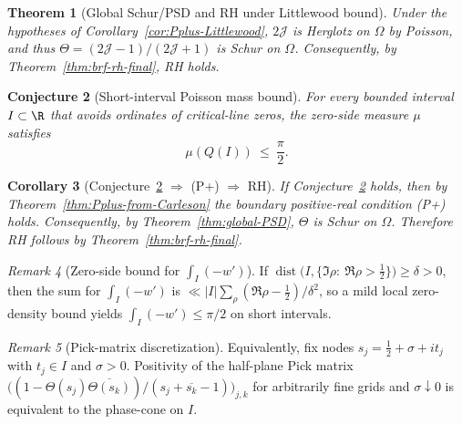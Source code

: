 \documentclass[11pt]{article}
\newtheorem{theorem}{Theorem}
\newtheorem{conjecture}[theorem]{Conjecture}
\newtheorem{corollary}[theorem]{Corollary}
\theoremstyle{remark}
\newtheorem{remark}[theorem]{Remark}
\begin{document}
\begin{theorem}[Global Schur/PSD and RH under Littlewood bound]\label{thm:global-RH-Littlewood}
Under the hypotheses of Corollary~\ref{cor:Pplus-Littlewood}, \(2\mathcal J\) is Herglotz on \(\Omega\) by Poisson, and thus \(\Theta=(2\mathcal J-1)/(2\mathcal J+1)\) is Schur on \(\Omega\). Consequently, by Theorem~\ref{thm:brf-rh-final}, RH holds.
\end{theorem}

\begin{conjecture}[Short-interval Poisson mass bound]\label{conj:short-interval-poisson}
For every bounded interval \(I\subset\R\) that avoids ordinates of critical-line zeros, the zero-side measure \(\mu\) satisfies
\[
 \mu(Q(I))\ \le\ \frac{\pi}{2}.
\]
\end{conjecture}

\begin{corollary}[Conjecture~\ref{conj:short-interval-poisson} \(\Rightarrow\) (P+) \(\Rightarrow\) RH]\label{cor:conj-to-RH}
If Conjecture~\ref{conj:short-interval-poisson} holds, then by Theorem~\ref{thm:Pplus-from-Carleson} the boundary positive-real condition \emph{(P+)} holds. Consequently, by Theorem~\ref{thm:global-PSD}, \(\Theta\) is Schur on \(\Omega\). Therefore RH follows by Theorem~\ref{thm:brf-rh-final}.
\end{corollary}
\begin{remark}[Zero-side bound for \(\int_I(-w')\)]
If \(\operatorname{dist}\big(I,\{\Im\rho:\ \Re\rho>\tfrac12\}\big)\ge \delta>0\), then the sum for \(\int_I(-w')\) is \(\ll |I|\sum_{\rho}(\Re\rho-\tfrac12)/\delta^2\), so a mild local zero-density bound yields \(\int_I(-w')\le \pi/2\) on short intervals.
\end{remark}

\begin{remark}[Pick-matrix discretization]\label{rem:pick-certificate}
Equivalently, fix nodes $s_j=\tfrac12+\sigma+i t_j$ with $t_j\in I$ and $\sigma>0$. Positivity of the half-plane Pick matrix \(\big((1-\Theta(s_j)\overline{\Theta(s_k)})/(s_j+\overline{s_k}-1)\big)_{j,k}\) for arbitrarily fine grids and $\sigma\downarrow 0$ is equivalent to the phase-cone on $I$.
\end{remark}
\end{document}
